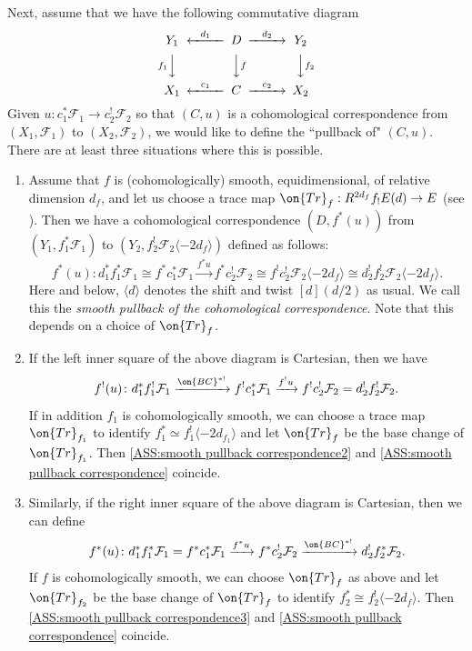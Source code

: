 \documentclass[11pt]{amsart}
\theoremstyle{definition}
\theoremstyle{definition}
\theoremstyle{definition}
\numberwithin{equation}{subsection}
\def\calF{\mathcal{F}}
\newcommand{\mF}{{\mathcal F}}
\newcommand{\Tr}{{\on{Tr}}}
\begin{document}
Next, assume that we have the following commutative diagram
\[\begin{CD}
Y_1@<d_1<< D@>d_2>> Y_2\\
@Vf_1VV@VVfV@VVf_2V\\
X_1@<c_1<<C@>c_2>>X_2
\end{CD}\]
 Given $u:c_1^*\mF_1\to c_2^!\mF_2$ so that $(C,u)$ is a cohomological correspondence from $(X_1,\mF_1)$ to $(X_2,\mF_2)$, we would like to define the ``pullback of" $(C,u)$.
There are at least three situations where this is possible.
\begin{enumerate}
\item[(1)] Assume that $f$ is (cohomologically) smooth, equidimensional, of relative dimension $d_f$, and let us choose a trace map $\Tr_f: R^{2d_f}f_!E(d)\to E$ (see \cite[Definition A.1.18]{XZ}).
Then we have a cohomological correspondence $(D, f^*(u))$ from $(Y_1, f_1^*\calF_1)$ to $(Y_2, f_2^!\calF_2\langle-2d_f\rangle)$ defined as follows:
\begin{equation}
\label{ASS:smooth pullback correspondence} 
f^*(u)\colon d_1^*f_1^*\mF_1\cong f^*c_1^*\mF_1\xrightarrow{f^*u} f^*c_2^!\mF_2\cong f^!c_2^!\mF_2\langle-2d_f\rangle \cong d_2^!f_2^!\mF_2\langle-2d_f\rangle.
\end{equation}
Here and below, $\langle d\rangle$ denotes the shift and twist $[d](d/2)$ as usual.
We call this the \emph{smooth pullback of the cohomological correspondence}. Note that this depends on a choice of $\Tr_f$.


\item[(2)]
If the left inner square of the above diagram is Cartesian, then we have
\begin{equation}
\label{ASS:smooth pullback correspondence2} 
f^!(u)\colon d_1^*f_1^!\mF_1\xrightarrow{\on{BC}^{*!}} f^!c_1^*\mF_1\xrightarrow{f^!u}f^!c_2^!\mF_2= d_2^!f_2^!\mF_2.
\end{equation}
If in addition $f_1$ is cohomologically smooth, we can choose a trace map $\Tr_{f_1}$ to identify $f^*_1\simeq f^!_1\langle-2d_{f_1}\rangle$ and let $\Tr_f$ be the base change of $\Tr_{f_1}$. Then \eqref{ASS:smooth pullback correspondence2}  and \eqref{ASS:smooth pullback correspondence} coincide. 

\item[(3)] Similarly, if the right inner square of the above diagram is Cartesian, then we can define
\begin{equation}
\label{ASS:smooth pullback correspondence3} 
f^*(u)\colon d_1^*f_1^*\mF_1= f^*c_1^*\mF_1\xrightarrow{f^*u} f^*c_2^!\mF_2\xrightarrow{\on{BC}^{*!}} d_2^! f_2^*\mF_2.
\end{equation}
If $f$ is cohomologically smooth, we can choose $\Tr_f$ as above and let $\Tr_{f_2}$ be the base change of $\Tr_f$ to identify $f_2^*\cong f_2^!\langle-2d_{f}\rangle$. Then
\eqref{ASS:smooth pullback correspondence3}  and \eqref{ASS:smooth pullback correspondence} coincide.
\end{enumerate}
\end{document}
